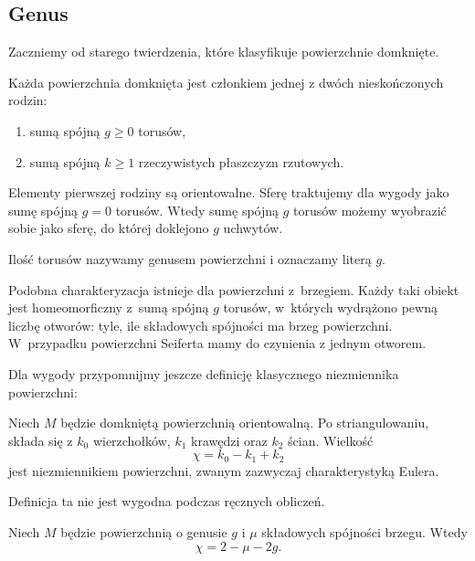 \subsection{Genus} %
\label{sec:genus}
Zaczniemy od starego twierdzenia, które klasyfikuje powierzchnie domknięte.

\begin{proposition}
    Każda powierzchnia domknięta jest członkiem jednej z dwóch nieskończonych rodzin:
    \begin{enumerate}[leftmargin=*]
        \itemsep0em
        \item sumą spójną $g \ge 0$ torusów,
        \item sumą spójną $k \ge 1$ rzeczywistych płaszczyzn rzutowych.
    \end{enumerate}
\end{proposition}

Elementy pierwszej rodziny są orientowalne.
Sferę traktujemy dla wygody jako sumę spójną $g = 0$ torusów.
Wtedy sumę spójną $g$ torusów możemy wyobrazić sobie jako sferę, do której doklejono $g$ uchwytów.

\begin{definition}
    Ilość torusów nazywamy genusem powierzchni i oznaczamy literą $g$.
\end{definition}

Podobna charakteryzacja istnieje dla powierzchni z~brzegiem.
Każdy taki obiekt jest homeomorficzny z~sumą spójną $g$ torusów, w~których wydrążono pewną liczbę otworów: tyle, ile składowych spójności ma brzeg powierzchni.
W~przypadku powierzchni Seiferta mamy do czynienia z jednym otworem.

Dla wygody przypomnijmy jeszcze definicję klasycznego niezmiennika powierzchni:

\begin{definition}
    Niech $M$ będzie domkniętą powierzchnią orientowalną.
    Po striangulowaniu, składa się z $k_0$ wierzchołków, $k_1$ krawędzi oraz $k_2$ ścian.
    Wielkość
    \begin{equation}
        \chi = k_0 - k_1 + k_2
    \end{equation}
    jest niezmiennikiem powierzchni, zwanym zazwyczaj charakterystyką Eulera.
\end{definition}

Definicja ta nie jest wygodna podczas ręcznych obliczeń.

\begin{proposition}
    Niech $M$ będzie powierzchnią o genusie $g$ i $\mu$ składowych spójności brzegu.
    Wtedy
    \begin{equation}
        \chi = 2 - \mu - 2g.
    \end{equation}
\end{proposition}

